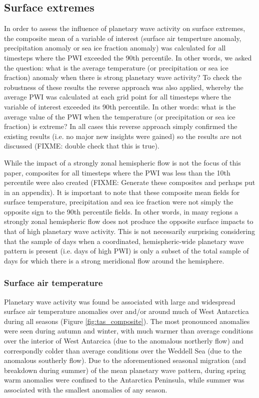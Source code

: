 \subsection{Surface extremes}

In order to assess the influence of planetary wave activity on surface extremes, the composite mean of a variable of interest (surface air temperture anomaly, precipitation anomaly or sea ice fraction anomaly) was calculated for all timesteps where the PWI exceeded the 90th percentile. In other words, we asked the question: what is the average temperature (or precipitation or sea ice fraction) anomaly when there is strong planetary wave activity? To check the robustness of these results the reverse approach was also applied, whereby the average PWI was calculated at each grid point for all timesteps where the variable of interest exceeded its 90th percentile. In other words: what is the average value of the PWI when the temperature (or precipitation or sea ice fraction) is extreme? In all cases this reverse approach simply confirmed the existing results (i.e. no major new insights were gained) so the results are not discussed (FIXME: double check that this is true).

While the impact of a strongly zonal hemispheric flow is not the focus of this paper, composites for all timesteps where the PWI was less than the 10th percentile were also created (FIXME: Generate these composites and perhaps put in an appendix). It is important to note that these composite mean fields for surface temperature, precipitation and sea ice fraction were not simply the opposite sign to the 90th percentile fields. In other words, in many regions a strongly zonal hemispheric flow does not produce the opposite surface impacts to that of high planetary wave activity. This is not necessarily surprising considering that the sample of days when a coordinated, hemispheric-wide planetary wave pattern is present (i.e. days of high PWI) is only a subset of the total sample of days for which there is a strong meridional flow around the hemisphere.


\subsubsection{Surface air temperature}

Planetary wave activity was found be associated with large and widespread surface air temperature anomalies over and/or around much of West Antarctica during all seasons (Figure \ref{fig:tas_composite}). The most pronounced anomalies were seen during autumn and winter, with much warmer than average conditions over the interior of West Antarcica (due to the anomalous northerly flow) and correspondly colder than average conditions over the Weddell Sea (due to the anomalous southerly flow). Due to the aforementioned seasonal migration (and breakdown during summer) of the mean planetary wave pattern, during spring warm anomalies were confined to the Antarctica Peninsula, while summer was associated with the smallest anomalies of any season.  

